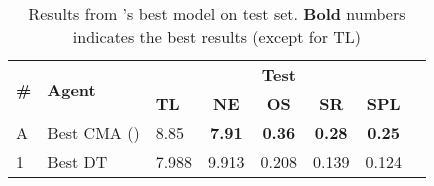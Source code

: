 \begin{table*}

\caption{\label{table:dt_test_final} Results from \citet{VLNCE}'s best model on test set. \textbf{Bold} numbers indicates the best results (except for TL)}
\renewcommand{\arraystretch}{1.2}
\centering
\small\addtolength{\tabcolsep}{-2.3pt}
\begin{tabular}{@{}lllccccc@{}}
\toprule
   \multirow{2}{*}{\textbf{\#}}
  & \multirow{2}{*}{\textbf{Agent}}
  & \multicolumn{5}{c}{\textbf{Test}} \\
  \cmidrule(l){3-7}
  & & \textbf{TL} & \textbf{NE} & \textbf{OS} & \textbf{SR} & \textbf{SPL} \\
\midrule
A & Best CMA (\citet{VLNCE})  & 8.85 & \textbf{7.91} & \textbf{0.36} & \textbf{0.28} & \textbf{0.25}  \\
\midrule
1 & Best DT  & 7.988 & 	9.913 & 0.208 & 0.139 & 0.124  \\

\bottomrule
\end{tabular}
\end{table*}
